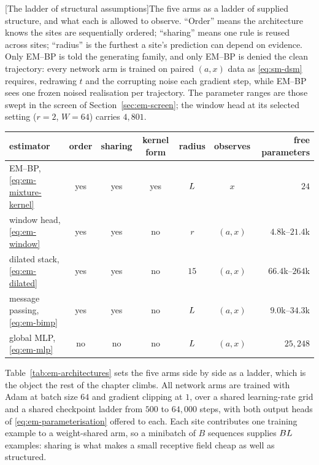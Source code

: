 \begin{center}
\begin{minipage}{\linewidth}\small\centering
{}[The ladder of structural assumptions]{The five arms as a
ladder of supplied structure, and what each is allowed to observe. ``Order''
means the architecture knows the sites are sequentially ordered; ``sharing''
means one rule is reused across sites; ``radius'' is the furthest a site's
prediction can depend on evidence. Only EM--BP is told the generating family,
and only EM--BP is denied the clean trajectory: every network arm is trained on
paired $(a,x)$ data as \eqref{eq:sm-dsm} requires, redrawing $t$ and the
corrupting noise each gradient step, while EM--BP sees one frozen noised
realisation per trajectory. The parameter ranges are those swept in
the screen of Section~\ref{sec:em-screen}; the window head at its selected
setting ($r = 2$, $W = 64$) carries $4{,}801$.}
\label{tab:em-architectures}
\begin{tabular}{@{}lcccccr@{}}
\toprule
estimator & order & sharing & kernel form & radius & observes & free parameters \\
\midrule
EM--BP, \eqref{eq:em-mixture-kernel} & yes & yes & yes & $L$ & $x$ & $24$ \\
window head, \eqref{eq:em-window} & yes & yes & no & $r$ & $(a,x)$ & $4.8$k--$21.4$k \\
dilated stack, \eqref{eq:em-dilated} & yes & yes & no & $15$ & $(a,x)$ & $66.4$k--$264$k \\
message passing, \eqref{eq:em-bimp} & yes & yes & no & $L$ & $(a,x)$ & $9.0$k--$34.3$k \\
global MLP, \eqref{eq:em-mlp} & no & no & no & $L$ & $(a,x)$ & $25{,}248$ \\
\bottomrule
\end{tabular}
\end{minipage}
\end{center}

\noindent Table~\ref{tab:em-architectures} sets the five arms side by side as a
ladder, which is the object the rest of the chapter climbs. All network arms are
trained with Adam at batch size $64$ and gradient
clipping at $1$, over a shared learning-rate grid and a shared checkpoint ladder
from $500$ to $64{,}000$ steps, with both output heads of
\eqref{eq:em-parameterisation} offered to each. Each site contributes one
training example to a weight-shared arm, so a minibatch of $B$ sequences
supplies $BL$ examples: sharing is what makes a small receptive field
cheap as well as structured.

